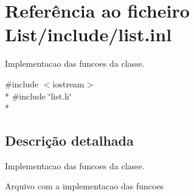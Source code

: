 \hypertarget{list_8inl}{}\section{Referência ao ficheiro List/include/list.inl}
\label{list_8inl}


Implementacao das funcoes da classe.  


{\ttfamily \#include $<$iostream$>$}\\*
{\ttfamily \#include \char`\"{}list.\+h\char`\"{}}\\*


\subsection{Descrição detalhada}
Implementacao das funcoes da classe. 

Arquivo com a implementacao das funcoes 